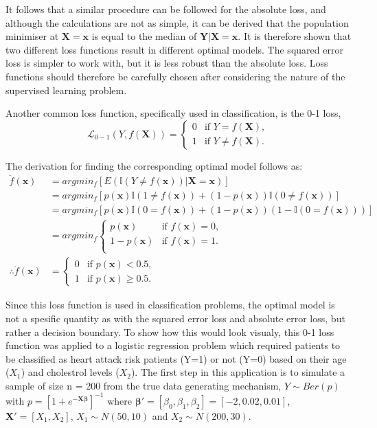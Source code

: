 \documentclass[11pt]{article}
\begin{document}
It follows that a similar procedure can be followed for the absolute
loss, and although the calculations are not as simple, it can be derived
that the population minimiser at \(\mathbf{X=x}\) is equal to the median
of \(\mathbf{Y}|\mathbf{X=x}\). It is therefore shown that two different
loss functions result in different optimal models. The squared error
loss is simpler to work with, but it is less robust than the absolute
loss. Loss functions should therefore be carefully chosen after
considering the nature of the supervised learning problem.

Another common loss function, specifically used in classification, is
the 0-1 loss, \[
\mathcal{L}_{0-1}(Y,f(\mathbf{X}))=\begin{cases}
                                0 &\text{if } Y=f(\mathbf{X}), \\
                                1 &\text{if } Y\ne f(\mathbf{X}). 
                              \end{cases}
\]

The derivation for finding the corresponding optimal model follows as:
\begin{align*}
  \ddot{f}(\mathbf{x})&=argmin_{f}[E(\mathbb{I}(Y\ne f(\mathbf{x}))|\mathbf{X}=\mathbf{x})] \\
  &= argmin_{f}[p(\mathbf{x})\mathbb{I}(1 \ne f(\mathbf{x}))+(1-p(\mathbf{x}))\mathbb{I}(0 \ne f(\mathbf{x}))] \\
  &= argmin_{f}[p(\mathbf{x})\mathbb{I}(0 = f(\mathbf{x}))+(1-p(\mathbf{x}))(1-\mathbb{I}(0 = f(\mathbf{x})))] \\
  &= argmin_{f}\begin{cases}
                    p(\mathbf{x}) &\text{if } f(\mathbf{x})=0, \\
                    1-p(\mathbf{x}) &\text{if } f(\mathbf{x})=1. \\
               \end{cases}\\
\therefore \ddot{f}(\mathbf{x})&=\begin{cases}
                                0 &\text{if } p(\mathbf{x})<0.5, \\
                                1 &\text{if } p(\mathbf{x})\ge 0.5. 
                              \end{cases}
\end{align*}

Since this loss function is used in classification problems, the optimal
model is not a spesific quantity as with the squared error loss and
absolute error loss, but rather a decision boundary. To show how this
would look visualy, this 0-1 loss function was applied to a logistic
regression problem which required patients to be classified as heart
attack risk patients (Y=1) or not (Y=0) based on their age (\(X_1\)) and
cholestrol levels (\(X_2\)). The first step in this application is to
simulate a sample of size n = 200 from the true data generating
mechanism, \(Y\sim Ber(p)\) with \(p=[1+e^{\mathbf{-X\beta}}]^{-1}\)
where \(\mathbf{\beta}'=[\beta_0,\beta_1,\beta_2]=[-2,0.02,0.01]\),
\(\mathbf{X}'=[X_1,X_2]\), \(X_1\sim N(50,10)\) and
\(X_2\sim N(200,30)\).
\end{document}
